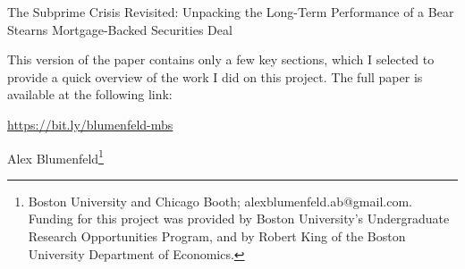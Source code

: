 \documentclass[12pt]{article}
\begin{document}
\begin{titlepage}
	\begin{center}
		
		\vspace*{2cm}
		
		\large
		The Subprime Crisis Revisited: Unpacking the Long-Term Performance of a Bear Stearns Mortgage-Backed Securities Deal

		\vspace{1cm}		
		
		\small	
		This version of the paper contains only a few key sections, which I selected to provide a quick overview of the work I did on this project. The full paper is available at the following link:
		
		\href{https://bit.ly/blumenfeld-mbs}{https://bit.ly/blumenfeld-mbs}
		
		\vspace{1cm}
		
		\large
		Alex Blumenfeld\footnote[1]{Boston University and Chicago Booth; alexblumenfeld.ab@gmail.com. Funding for this project was provided by Boston University's Undergraduate Research Opportunities Program, and by Robert King of the Boston University Department of Economics.}
		
		\vspace{0.5cm}
		
		\begin{abstract}
\noindent Residential mortgage-backed securities came under intense public scrutiny after the 2007 financial crisis and the subsequent Great Recession, but have since lost their status as a significant political issue. To provide some answers about whether these securities were truly as dangerous as many suspected during the crisis, I engage in a ``postmortem'' on one securitization which was issued shortly before the financial chaos of 2007: Bear Stearns Asset-Backed Securities 2006-HE10. I find that out of an original principal pool of roughly \$1.1 billion, 44.2\% of the total principal from the deal’s mortgages has been written off due to defaults, but thanks to several provisions in the deal's structure, investors have felt only 50.6\% of these losses, giving them a principal loss rate of 23.5\% through March 2020. As for the underlying mortgages, I find that foreclosures did not peak until around 2012, showing that security principal markdowns which occurred during the financial crisis itself did not capture the full extent of the mortgages’ poor performance. I also focus on two senior tranches which were purchased by the Federal Reserve’s Maiden Lane fund in 2008, when the Fed agreed to buy seemingly toxic securities from Bear Stearns’s portfolio to facilitate the firm’s sale to JPMorgan Chase. One of these tranches has suffered only modest principal losses, and the other has had no principal losses whatsoever, suggesting that little in-depth analysis of these securities was conducted during the height of the crisis.
		\end{abstract}
		
		\vfill
		
	\end{center}
\end{titlepage}
\end{document}
